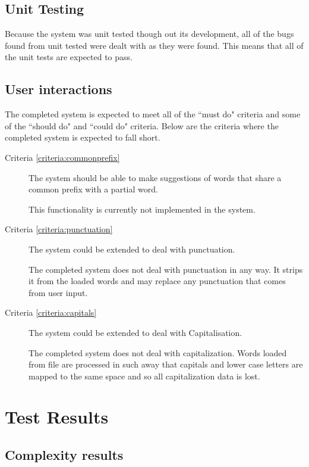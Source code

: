 \documentclass[10pt]{article} %
\begin{document}
		\subsection{Unit Testing}
		Because the system was unit tested though out its development, all of the bugs found from unit tested were dealt with as they were found. This means that all of the unit tests are expected to pass.
		
		\subsection{User interactions}
		The completed system is expected to meet all of the ``must do" criteria and some of the ``should do" and ``could do" criteria. Below are the criteria where the completed system is expected to fall short.
		
		\begin{description}
		    
			\item [Criteria \ref{criteria:commonprefix} ] The system should be able to make suggestions of words that share a common prefix with a partial word.
			
			This functionality is currently not implemented in the system.
			
		    \item [Criteria \ref{criteria:punctuation} ] The system could be extended to deal with punctuation.
		    
		    The completed system does not deal with punctuation in any way. It strips it from the loaded words and may replace any punctuation that comes from user input.
			
			\item [Criteria  \ref{criteria:capitals} ] The system could be extended to deal with Capitalisation.
			
			The completed system does not deal with capitalization. Words loaded from file are processed in such away that capitals and lower case letters are mapped to the same space and so all capitalization data is lost.
			
			
        \end{description}

	\section{Test Results}
	        \subsection{Complexity results}
\end{document}
